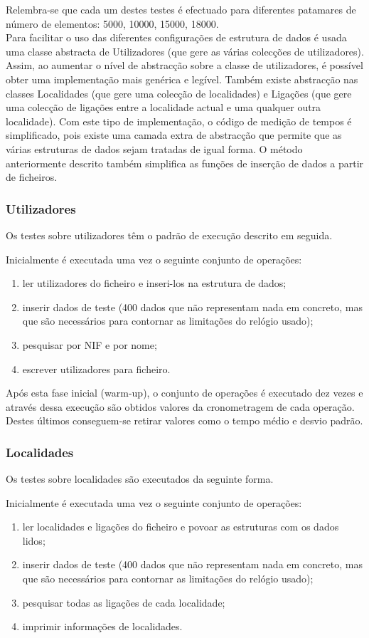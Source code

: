 \documentclass[a5paper,twocolumn, 11pt]{article}
\def\hyph{-\penalty0\hskip0pt\relax}
\begin{document}
Relembra-se que cada um destes testes é efectuado para diferentes patamares de número de elementos: 5000, 10000, 15000, 18000.\\

Para facilitar o uso das diferentes configurações de estrutura de dados é usada uma classe abstracta de Utilizadores (que gere as várias colecções de utilizadores). Assim, ao aumentar o nível de abstracção sobre a classe de utilizadores, é possível obter uma implementação mais genérica e legível. Também existe abstracção nas classes Localidades (que gere uma colecção de localidades) e Ligações (que gere uma colecção de ligações entre a localidade actual e uma qualquer outra localidade).
Com este tipo de implementação, o código de medição de tempos é simplificado, pois existe uma camada extra de abstracção que permite que as várias estruturas de dados sejam tratadas de igual forma. O método anteriormente descrito também simplifica as funções de inserção de dados a partir de ficheiros.
\subsubsection{Utilizadores}
Os testes sobre utilizadores têm o padrão de execução descrito em seguida.

Inicialmente é executada uma vez o seguinte conjunto de operações:
\begin{enumerate}
    \item ler utilizadores do ficheiro e inseri-los na estrutura de dados;
    \item inserir dados de teste (400 dados que não representam nada em concreto, mas que são necessários para contornar as limitações do relógio usado);
    \item pesquisar por NIF e por nome;
    \item escrever utilizadores para ficheiro.
\end{enumerate}
Após esta fase inicial (warm\hyph{}up), o conjunto de operações é executado dez vezes e através dessa execução são obtidos valores da cronometragem de cada operação. Destes últimos conseguem-se retirar valores como o tempo médio e desvio padrão.\\
\subsubsection{Localidades}
Os testes sobre localidades são executados da seguinte forma.

Inicialmente é executada uma vez o seguinte conjunto de operações:
\begin{enumerate}
    \item ler localidades e ligações do ficheiro e povoar as estruturas com os dados lidos;
    \item inserir dados de teste (400 dados que não representam nada em concreto, mas que são necessários para contornar as limitações do relógio usado);
    \item pesquisar todas as ligações de cada localidade;
    \item imprimir informações de localidades.
\end{enumerate}
\end{document}
